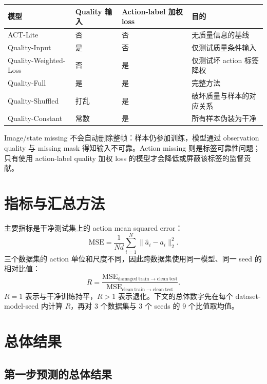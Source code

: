 \documentclass[11pt,a4paper]{ctexart}
\begin{document}
\begin{table}[htbp]
\centering
\small
\begin{tabularx}{\linewidth}{p{38mm} C{24mm} C{26mm} Y}
\toprule
模型 & Quality 输入 & Action-label 加权 loss & 目的\\
\midrule
ACT-Lite & 否 & 否 & 无质量信息的基线\\
Quality-Input & 是 & 否 & 仅测试质量条件输入\\
Quality-Weighted-Loss & 否 & 是 & 仅测试坏 action 标签降权\\
Quality-Full & 是 & 是 & 完整方法\\
Quality-Shuffled & 打乱 & 是 & 破坏质量与样本的对应关系\\
Quality-Constant & 常数 & 是 & 所有样本伪装为干净\\
\bottomrule
\end{tabularx}
\end{table}

Image/state missing 不会自动删除整帧：样本仍参加训练，模型通过 observation quality 与 missing mask 得知输入不可靠。Action missing 则是标签可靠性问题；只有使用 action-label quality 加权 loss 的模型才会降低或屏蔽该标签的监督贡献。

\section{指标与汇总方法}

主要指标是干净测试集上的 action mean squared error：
\[
\mathrm{MSE}=\frac{1}{N d}\sum_{i=1}^{N}\lVert\hat{a}_i-a_i\rVert_2^2.
\]
三个数据集的 action 单位和尺度不同，因此跨数据集使用同一模型、同一 seed 的相对比值：
\[
R=\frac{\mathrm{MSE}_{\mathrm{damaged\ train}\rightarrow\mathrm{clean\ test}}}
{\mathrm{MSE}_{\mathrm{clean\ train}\rightarrow\mathrm{clean\ test}}}.
\]
$R=1$ 表示与干净训练持平，$R>1$ 表示退化。下文的总体数字先在每个 dataset-model-seed 内计算 $R$，再对 3 个数据集与 3 个 seeds 的 9 个比值取均值。

\section{总体结果}

\subsection{第一步预测的总体结果}
\end{document}
